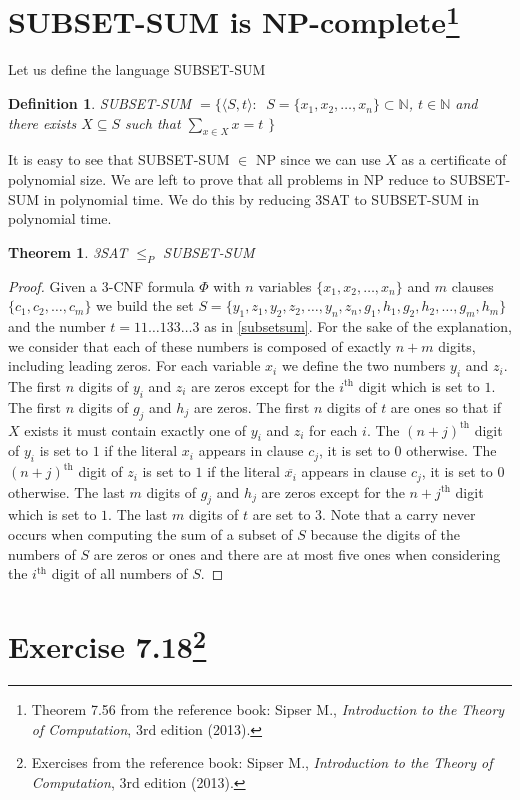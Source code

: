\documentclass{article}
\newcommand{\theoremname}{Theorem}
\newcommand{\definitionname}{Definition}
\newtheorem{theorem}{\theoremname}
\newtheorem{definition}{\definitionname}
\newcommand{\st}{\colon\,}
\newcommand{\N}{\mathbb{N}}
\newcommand{\nth}[1]{#1^{\text{th}}}
\begin{document}
\section{SUBSET-SUM is NP-complete\footnote{%
Theorem 7.56 from the reference book: Sipser M.,
\emph{Introduction to the Theory of Computation}, 3rd edition (2013).}}
Let us define the language SUBSET-SUM
\begin{definition}
	SUBSET-SUM \(= \{\langle S, t\rangle \st\)
	\(S = \{x_1,x_2,\ldots,x_n\} \subset \N\),
	\(t \in \N\) and there exists \(X \subseteq S\) such that
	\(\sum_{x \in X} x = t\)
	\(\}\)
\end{definition}
It is easy to see that SUBSET-SUM \(\in\) NP since we can use \(X\) as a
certificate of polynomial size.
We are left to prove that all problems in NP reduce to SUBSET-SUM in polynomial
time. We do this by reducing 3SAT to SUBSET-SUM in polynomial time.
\begin{theorem}
	3SAT \(\le_P\) SUBSET-SUM
\end{theorem}
\begin{proof}
	Given a 3-CNF formula \(\Phi\) with \(n\) variables
	\(\{x_1,x_2,\ldots,x_n\}\) and \(m\) clauses \(\{c_1,c_2,\ldots,c_m\}\)
	we build the set \(S =
	\{y_1,z_1,y_2,z_2,\ldots,y_n,z_n,g_1,h_1,g_2,h_2,\ldots,g_m,h_m\}\) and the
	number \(t = 11\ldots133\ldots3\) as in
	\ref{subsetsum}. For the sake of the explanation, we consider that each of
	these numbers is composed of exactly \(n+m\) digits, including leading
	zeros.
	For each variable \(x_i\) we define the two numbers
	\(y_i\) and \(z_i\). The first \(n\) digits of \(y_i\) and \(z_i\) are
	zeros except for the \(\nth{i}\) digit which is set to \(1\). The first
	\(n\) digits of \(g_j\) and \(h_j\) are zeros. The first
	\(n\) digits of \(t\) are ones so that if \(X\) exists it must contain
	exactly one of \(y_i\) and \(z_i\) for each \(i\).
	The \(\nth{(n+j)}\) digit of \(y_i\) is set to \(1\) if the literal \(x_i\)
	appears in clause \(c_j\), it is set to \(0\) otherwise.
	The \(\nth{(n+j)}\) digit of \(z_i\) is set to \(1\) if the literal
	\(\overline{x_i}\)
	appears in clause \(c_j\), it is set to \(0\) otherwise. The last \(m\)
	digits of \(g_j\) and \(h_j\) are zeros except for the \(\nth{n+j}\) digit
	which is set to \(1\). The last \(m\) digits of \(t\) are set to \(3\).
	Note that a carry never occurs when computing the sum of a subset of \(S\)
	because the digits of the numbers of \(S\) are zeros or ones and there are
	at most five ones when considering the \(\nth{i}\) digit of all numbers of
	\(S\).
\end{proof}

\begin{table}\label{subsetsum}
\end{table}


\section{Exercise 7.18\footnote{%
Exercises from the reference book: Sipser M.,
\emph{Introduction to the Theory of Computation}, 3rd edition (2013).}}
\end{document}
